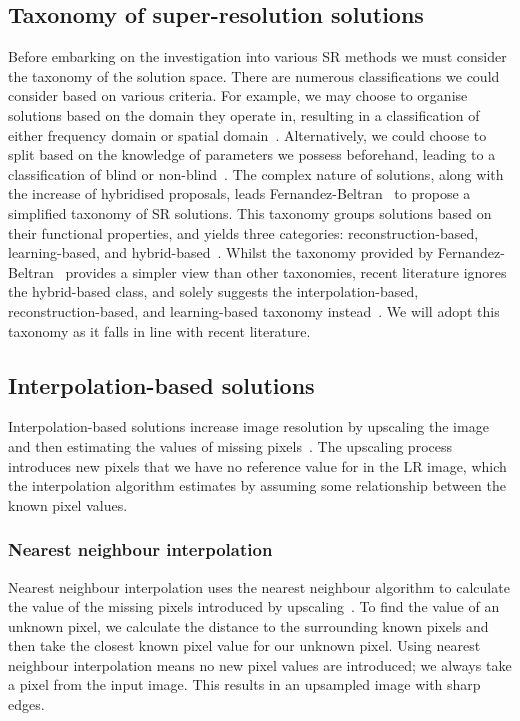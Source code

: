 \subsection{Taxonomy of super-resolution solutions}
Before embarking on the investigation into various SR methods we must consider the taxonomy of the solution space. There are numerous classifications we could consider based on various criteria. For example, we may choose to organise solutions based on the domain they operate in, resulting in a classification of either frequency domain or spatial domain~\cite{superResRemoteSensingOverview}. Alternatively, we could choose to split based on the knowledge of parameters we possess beforehand, leading to a classification of blind or non-blind~\cite{superResRemoteSensingOverview}. The complex nature of solutions, along with the increase of hybridised proposals, leads Fernandez-Beltran \etal\ to propose a simplified taxonomy of SR solutions. This taxonomy groups solutions based on their functional properties, and yields three categories: reconstruction-based, learning-based, and hybrid-based~\cite{superResRemoteSensingOverview}. Whilst the taxonomy provided by Fernandez-Beltran \etal\ provides a simpler view than other taxonomies, recent literature ignores the hybrid-based class, and solely suggests the interpolation-based, reconstruction-based, and learning-based taxonomy instead~\cite{remoteSensingDeepLearningReview, remoteSensingGANsReview, isrgan, tesagan}. We will adopt this taxonomy as it falls in line with recent literature.

\subsection{Interpolation-based solutions}
Interpolation-based solutions increase image resolution by upscaling the image and then estimating the values of missing pixels~\cite{interpolation}. The upscaling process introduces new pixels that we have no reference value for in the LR image, which the interpolation algorithm estimates by assuming some relationship between the known pixel values. 

\subsubsection{Nearest neighbour interpolation}
Nearest neighbour interpolation uses the nearest neighbour algorithm to calculate the value of the missing pixels introduced by upscaling~\cite{nnInterpolation}. To find the value of an unknown pixel, we calculate the distance to the surrounding known pixels and then take the closest known pixel value for our unknown pixel. Using nearest neighbour interpolation means no new pixel values are introduced; we always take a pixel from the input image. This results in an upsampled image with sharp edges.

